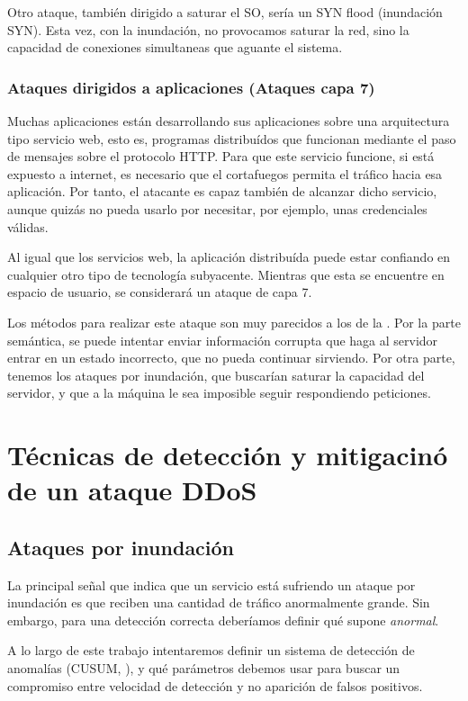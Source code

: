 Otro ataque, también dirigido a saturar el \gls{SO}, sería un \gls{SYN} flood (inundación \gls{SYN}). Esta vez, con la inundación, 
no provocamos saturar la red, sino la capacidad de conexiones simultaneas que aguante el sistema.

\subsubsection{Ataques dirigidos a aplicaciones (Ataques capa 7)}

Muchas aplicaciones están desarrollando sus aplicaciones sobre una arquitectura tipo servicio web, esto es, programas 
distribuídos que funcionan mediante el paso de mensajes sobre el protocolo HTTP. Para que este servicio funcione, si 
está expuesto a internet, es necesario que el cortafuegos permita el tráfico hacia esa aplicación. Por tanto, el 
atacante es capaz también de alcanzar dicho servicio, aunque quizás no pueda usarlo por necesitar, por ejemplo, unas 
credenciales válidas.

Al igual que los servicios web, la aplicación distribuída puede estar confiando en cualquier otro tipo de tecnología 
subyacente. Mientras que esta se encuentre en espacio de usuario, se considerará un ataque de capa 7.

Los métodos para realizar este ataque son muy parecidos a los de la . Por la parte semántica, se 
puede intentar enviar información corrupta que haga al servidor entrar en un estado incorrecto, que no pueda continuar 
sirviendo. Por otra parte, tenemos los ataques por inundación, que buscarían saturar la capacidad del servidor, y que 
a la máquina le sea imposible seguir respondiendo peticiones.


\section{Técnicas de detección y mitigacinó de un ataque DDoS}
\subsection{Ataques por inundación}
La principal señal que indica que un servicio está sufriendo un ataque por inundación es que reciben una cantidad de 
tráfico anormalmente grande. Sin embargo, para una detección correcta deberíamos definir qué supone \emph{anormal}. 

A lo largo de este trabajo intentaremos definir un sistema de detección de anomalías (CUSUM, ), y qué 
parámetros debemos usar para buscar un compromiso entre velocidad de detección y no aparición de falsos positivos.

